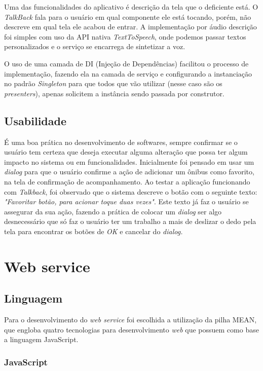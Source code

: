 \documentclass[
	12pt,				%
	oneside,			%
	a4paper,			%
	brazil				%
]{abntex2}
\begin{document}
Uma das funcionalidades do aplicativo é descrição da tela que o deficiente está. O \textit{TalkBack} fala para o usuário em qual componente ele está tocando, porém, não descreve em qual tela ele acabou de entrar. 
A implementação por áudio descrição foi simples com uso da API nativa \textit{TextToSpeech}, onde podemos passar textos personalizados e o serviço se encarrega de sintetizar a voz.

O uso de uma camada de DI (Injeção de Dependências) facilitou o processo de implementação, fazendo ela na camada de serviço e configurando a instanciação no padrão \textit{Singleton} para que todos que vão utilizar (nesse caso são os \textit{presenters}), apenas solicitem a instância sendo passada por construtor.

\subsection{Usabilidade}

É uma boa prática no desenvolvimento de softwares, sempre confirmar se o usuário tem certeza que deseja executar alguma alteração que possa ter algum impacto no sistema ou em funcionalidades. Inicialmente foi pensado em usar um \textit{dialog} para que o usuário confirme a ação de adicionar um ônibus como favorito, na tela de confirmação de acompanhamento.
Ao testar a aplicação funcionando com \textit{Talkback}, foi observado que o sistema descreve o botão com o seguinte texto: \textit{"Favoritar botão, para acionar toque duas vezes"}. Este texto já faz o usuário se assegurar da sua ação, fazendo a prática de colocar um \textit{dialog} ser algo desnecessário que só faz o usuário ter um trabalho a mais de deslizar o dedo pela tela para encontrar os botões de \textit{OK} e cancelar do \textit{dialog.} 

\section{Web service}

\subsection{Linguagem}

Para o desenvolvimento do \textit{web service} foi escolhida a utilização da pilha MEAN, que engloba quatro tecnologias para desenvolvimento \textit{web} que possuem como base a linguagem JavaScript.


\subsubsection{JavaScript}
\end{document}
